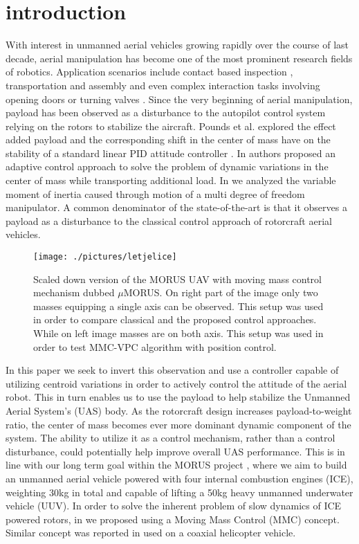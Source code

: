 \section{introduction}
With interest in unmanned aerial vehicles growing rapidly over the course of last decade, aerial manipulation has become one of the most prominent research fields of robotics. Application scenarios include contact based inspection \cite{Alexis2016}, transportation and assembly \cite{Jimenez-Cano2013} and even complex interaction tasks involving opening doors \cite{Tsukagoshi2015} or turning valves \cite{Korpela2014a}. Since the very beginning of aerial manipulation, payload has been observed as a disturbance to the autopilot control system relying on the rotors to stabilize the aircraft. Pounds et al. explored the effect added payload and the corresponding shift in the center of mass have on the stability of a standard linear PID attitude controller \cite{Pounds2012}. In \cite{PalunkoIFAC2011} authors proposed an adaptive control approach to solve the problem of dynamic variations in the center of mass while transporting additional load. In \cite {Korpela2012} we analyzed the variable moment of inertia caused through motion of a multi degree of freedom manipulator. A common denominator of the state-of-the-art is that it observes a payload as a disturbance to the classical control approach of rotorcraft aerial vehicles. 
\begin{figure}[t!]
	\centering
	\texttt{[image: ./pictures/letjelice]}
	\caption{Scaled down version of the MORUS UAV with moving mass control mechanism dubbed $\mu$MORUS. On right part of the image only two masses equipping a single axis can be observed. This setup was used in order to compare classical and the proposed control approaches. While on left image masses are on both axis. This setup was used in order to test MMC-VPC algorithm with position control.}
	\label{fig:FlyingSCARA}
\end{figure}

In this paper we seek to invert this observation and use a controller capable of utilizing centroid variations in order to actively control the attitude of the aerial robot. This in turn enables us to use the payload to help stabilize the Unmanned Aerial System's (UAS) body. As the rotorcraft design increases payload-to-weight ratio, the center of mass becomes ever more dominant dynamic component of the system. The ability to utilize it as a control mechanism, rather than a control disturbance, could potentially help improve overall UAS performance. This is in line with our long term goal within the MORUS project \cite{MORUSweb}, where we aim to build an unmanned aerial vehicle powered with four internal combustion engines (ICE), weighting 30kg in total and capable of lifting a 50kg heavy unmanned underwater vehicle (UUV). In order to solve the inherent problem of slow dynamics of ICE powered rotors, in \cite{Haus2017} we proposed using a Moving Mass Control (MMC) concept. Similar concept was reported in \cite{bermes2008new} used on a coaxial helicopter vehicle.

